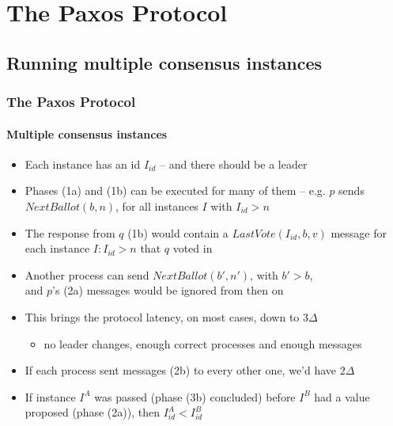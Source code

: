 \documentclass[10 pt]{beamer}
\begin{document}
\section{The Paxos Protocol}

\subsection{Running multiple consensus instances}


\begin{frame}
  \frametitle{The \textbf{Paxos} Protocol}
  \framesubtitle{Multiple consensus instances}
  
  \begin{itemize}
    \item Each instance has an id $I_{id}$ -- and there should be a leader %
    \item Phases (1a) and (1b) can be executed for many of them --
    e.g. $p$ sends $NextBallot(b,n)$, for all instances $I$ with $I_{id} > n$
    \item The response from $q$ (1b) would contain a $LastVote(I_{id}, b, v)$ message for each instance $I : I_{id} > n$ that $q$ voted in
    \item Another process can send $NextBallot(b',n')$, with $b' > b$,\\
    and $p$'s (2a) messages would be ignored from then on
    \item This brings the protocol latency, on most cases, down to $3\Delta$
    \begin{itemize}
      \item no leader changes, enough correct processes and enough messages
    \end{itemize}
    \item If each process sent messages (2b) to every other one, we'd have $2\Delta$ %
    \item If instance $I^A$ was passed (phase (3b) concluded) before $I^B$ had a value proposed (phase (2a)), then $I^A_{id} < I^B_{id}$
  \end{itemize}

\end{frame}
\end{document}

